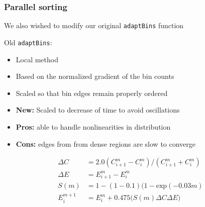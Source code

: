 \documentclass{beamer}
\begin{document}
\begin{frame}
	\frametitle{Parallel sorting}
	
	We also wished to modify our original \texttt{adaptBins} function
	
	
	\begin{block}{Old \texttt{adaptBins}:}
		\begin{itemize}
			\item Local method
			\item Based on the normalized gradient of the bin counts
			\item Scaled so that bin edges remain properly ordered
			\item \textbf{New:} Scaled to decrease of time to avoid oscillations
			\item \textbf{Pros:} able to handle nonlinearities in distribution
			\item \textbf{Cons:} edges from from dense regions are slow to converge
		\end{itemize}
	\end{block}
	
	\vspace{-5pt}
	
	\begin{equation}
		\begin{split}
			\Delta C & = 2.0 ( C^{m}_{i+1} - C^{m}_i ) / ( C^{m}_{i+1} + C^{m}_i ) \\
			\Delta E & = E^m_{i+1} - E^m_i \\
			S(m) & = 1 - (1 - 0.1) (1 - \textrm{exp}(-0.03 m) \\
			E^{m+1}_i & = E^m_i + 0.475 \big( S(m) \Delta C \Delta E \big)
		\end{split}
	\end{equation}
	
\end{frame}
\end{document}
